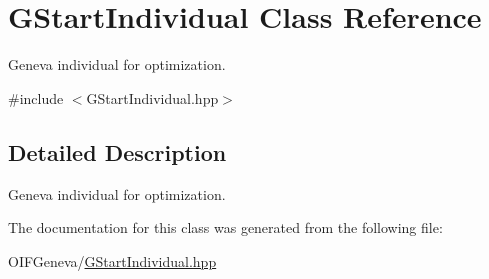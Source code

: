 \hypertarget{classGStartIndividual}{
\section{GStartIndividual Class Reference}
\label{dd/d33/classGStartIndividual}
}


Geneva individual for optimization.  




{\ttfamily \#include $<$GStartIndividual.hpp$>$}



\subsection{Detailed Description}
Geneva individual for optimization. 

The documentation for this class was generated from the following file:\begin{DoxyCompactItemize}
\item 
OIFGeneva/\hyperlink{GStartIndividual_8hpp}{GStartIndividual.hpp}\end{DoxyCompactItemize}
